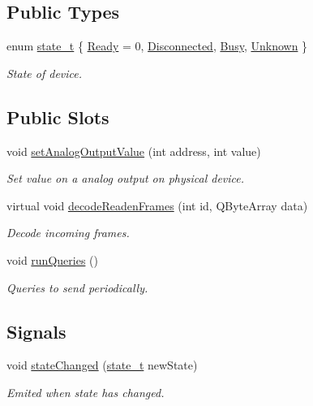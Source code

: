 \subsection*{Public Types}
\begin{DoxyCompactItemize}
\item 
enum \hyperlink{classmdt_device_a39c301b1fda803dba0c9ab98164a9d1e}{state\_\-t} \{ \hyperlink{classmdt_device_a39c301b1fda803dba0c9ab98164a9d1ea577f509c27c399a211c5dc18c0235b69}{Ready} =  0, 
\hyperlink{classmdt_device_a39c301b1fda803dba0c9ab98164a9d1eae06fa1b4e5872df7470aeed0878a2947}{Disconnected}, 
\hyperlink{classmdt_device_a39c301b1fda803dba0c9ab98164a9d1ea4a064f3dc9a486991b3ec09127b1c42a}{Busy}, 
\hyperlink{classmdt_device_a39c301b1fda803dba0c9ab98164a9d1ea9e9410b52d18a2c4da60748530709f09}{Unknown}
 \}
\begin{DoxyCompactList}\small\item\em State of device. \end{DoxyCompactList}\end{DoxyCompactItemize}
\subsection*{Public Slots}
\begin{DoxyCompactItemize}
\item 
void \hyperlink{classmdt_device_abd713b7ac9bb3c048959efa0cad88e1e}{setAnalogOutputValue} (int address, int value)
\begin{DoxyCompactList}\small\item\em Set value on a analog output on physical device. \end{DoxyCompactList}\item 
virtual void \hyperlink{classmdt_device_a750ada2532cff71844a52573f62a2874}{decodeReadenFrames} (int id, QByteArray data)
\begin{DoxyCompactList}\small\item\em Decode incoming frames. \end{DoxyCompactList}\item 
void \hyperlink{classmdt_device_a14634fec6cd6bae810562b3bd88a5c05}{runQueries} ()
\begin{DoxyCompactList}\small\item\em Queries to send periodically. \end{DoxyCompactList}\end{DoxyCompactItemize}
\subsection*{Signals}
\begin{DoxyCompactItemize}
\item 
\hypertarget{classmdt_device_a1ac5cf5f1102ae12a2cbe2f55770983d}{
void \hyperlink{classmdt_device_a1ac5cf5f1102ae12a2cbe2f55770983d}{stateChanged} (\hyperlink{classmdt_device_a39c301b1fda803dba0c9ab98164a9d1e}{state\_\-t} newState)}
\label{classmdt_device_a1ac5cf5f1102ae12a2cbe2f55770983d}

\begin{DoxyCompactList}\small\item\em Emited when state has changed. \end{DoxyCompactList}\end{DoxyCompactItemize}
